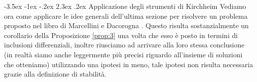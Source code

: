 \documentclass[a4paper,11pt]{book}
\makeatletter
\theoremstyle{plain}
\theoremstyle{definition}
\theoremstyle{remark}
\renewcommand\section{\@startsection {section}{1}{\z@}%
                                   {-3.5ex \@plus -1ex \@minus -.2ex}%
                                   {2.3ex \@plus.2ex}%
                                   {\normalfont\Large\bfseries}}
\makeatother
\begin{document}
\section{Applicazione degli strumenti di Kirchheim}
Vediamo ora come applicare le idee generali dell'ultima sezione per risolvere un problema proposto nel libro di Marcellini e Dacorogna \cite{marcellini}. Questo risulta sostanzialmente un corollario della Proposizione \ref{prop:3} una volta che esso è posto in termini di inclusioni differenziali, inoltre riusciamo ad arrivare alla loro stessa conclusione (in realtà siamo anche leggermente più precisi riguardo all'insieme di soluzioni che otteniamo) utilizzando una ipotesi in meno, tale ipotesi non risulta necessaria grazie alla definizione di stabilità.

\end{document}
